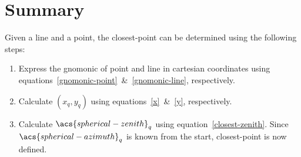 \section*{Summary}
Given a \acf{line} and a \acf{point}, the \acf{closest-point} can be determined using the following steps:
\begin{enumerate}
    \item Express the \acf{gnomonic} of \acs{point} and \acs{line} in cartesian coordinates using equations~\ref{gnomonic-point}~\&~\ref{gnomonic-line}, respectively.
    \item Calculate $\left(x_q,y_q\right)$ using equations~\ref{x}~\&~\ref{y}, respectively.
    \item Calculate $\acs{spherical-zenith}_q$ using equation~\ref{closest-zenith}. Since $\acs{spherical-azimuth}_q$ is known from the start, \acs{closest-point} is now defined.
\end{enumerate}